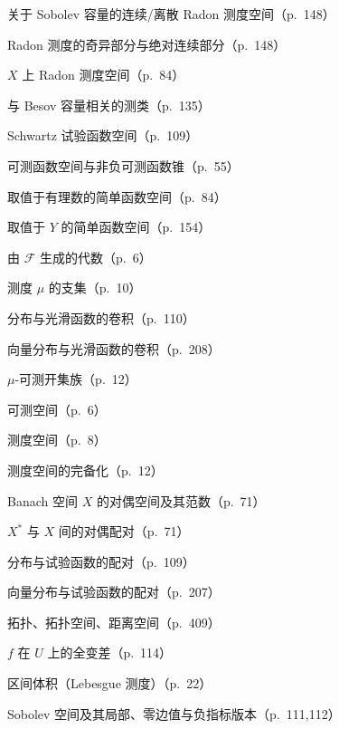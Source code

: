 \documentclass[../main.tex]{subfiles}
\begin{document}
\begin{description}[style=nextline,leftmargin=1.2em,itemsep=1pt,topsep=2pt,font=\normalfont\small]
\item[{$\mathscr{R}_{c,m,p}(U),\ \mathscr{R}_{c,p}(U),\ \mathscr{R}_{d,m,p}(U),\ \mathscr{R}_{d,p}(U)$}] 关于 Sobolev 容量的连续/离散 Radon 测度空间（p.~148）
\item[{$\mathscr{R}_s(U),\ \mathscr{R}_{ac}(U)$}] Radon 测度的奇异部分与绝对连续部分（p.~148）
\item[{$\mathscr{R}(X)$}] $X$ 上 Radon 测度空间（p.~84）
\item[{$\mathscr{R}_{r,p}(E)$}] 与 Besov 容量相关的测类（p.~135）
\item[{$\mathcal{S}(U)$}] Schwartz 试验函数空间（p.~109）
\item[{$\mathcal{S}(X),\ \mathcal{S}^+(X)$}] 可测函数空间与非负可测函数锥（p.~55）
\item[{$\mathcal{S}_\mathbb{Q}(X)$}] 取值于有理数的简单函数空间（p.~84）
\item[{$\mathcal{S}(X;Y)$}] 取值于 $Y$ 的简单函数空间（p.~154）
\item[{$\sigma_0(\mathcal{F})$}] 由 $\mathcal{F}$ 生成的代数（p.~6）
\item[{$\operatorname{supp}\mu$}] 测度 $\mu$ 的支集（p.~10）
\item[{$T*\rho$（标量分布）}] 分布与光滑函数的卷积（p.~110）
\item[{$T*\rho$（向量分布）}] 向量分布与光滑函数的卷积（p.~208）
\item[{$\mathcal{U}_\mu$}] $\mu$-可测开集族（p.~12）
\item[{$(X,\mathcal{A})$}] 可测空间（p.~6）
\item[{$(X,\mathcal{A},\mu)$}] 测度空间（p.~8）
\item[{$(X,\overline{\mathcal{A}},\overline{\mu})$}] 测度空间的完备化（p.~12）
\item[{$X^*,\ \|x^*\|_{X^*}$}] Banach 空间 $X$ 的对偶空间及其范数（p.~71）
\item[{$\langle\cdot,\cdot\rangle_{X^*,X}$}] $X^*$ 与 $X$ 间的对偶配对（p.~71）
\item[{$\langle T,\zeta\rangle$（标量分布）}] 分布与试验函数的配对（p.~109）
\item[{$\langle T,\zeta\rangle$（向量分布）}] 向量分布与试验函数的配对（p.~207）
\item[{$\mathcal{T},\ (X,\mathcal{T}),\ (X,d)$}] 拓扑、拓扑空间、距离空间（p.~409）
\item[{$V(f;U)$}] $f$ 在 $U$ 上的全变差（p.~114）
\item[{$\operatorname{vol}((a,b])$}] 区间体积（Lebesgue 测度）（p.~22）
\item[{$W^{m,p}(U),\ W^{m,p}_{\mathrm{loc}}(U),\ W^{m,p}_0(U),\ W^{-m,q}(U)$}] Sobolev 空间及其局部、零边值与负指标版本（p.~111,112）

\end{description}
\end{document}
